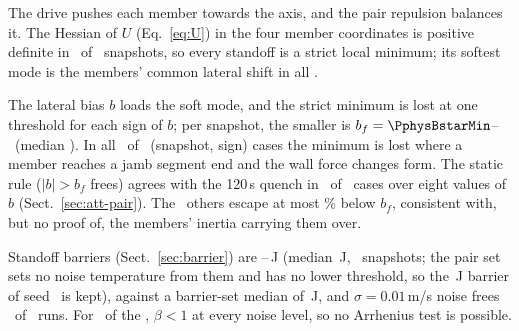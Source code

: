 The drive pushes each member towards the axis, and the pair repulsion balances it. The Hessian of $U$ (Eq.~\eqref{eq:U}) in the four member coordinates is positive definite in \PairStrictMin\ of \PairN\ snapshots, so every standoff is a strict local minimum; its softest mode is the members' common lateral shift in all \PairSoftCommon.

The lateral bias $b$ loads the soft mode, and the strict minimum is lost at one threshold for each sign of $b$; per snapshot, the smaller is $b_f=\PphysBstarMin$--\PairBstarMax\ (median \PairBstarMed). In all \RunNSixAtEnd\ of \RunNSixN\ (snapshot, sign) cases the minimum is lost where a member reaches a jamb segment end and the wall force changes form. The static rule ($|b|>b_f$ frees) agrees with the 120\,s quench in \PairFoldAgree\ of \PairFoldN\ cases over eight values of $b$ (Sect.~\ref{sec:att-pair}). The \PairFoldFN\ others escape at most \PphysFoldMissGap\% below $b_f$, consistent with, but no proof of, the members' inertia carrying them over.

Standoff barriers (Sect.~\ref{sec:barrier}) are \PphysPairBarMin--\PairBarMax\,J (median \PairBarMed\,J, \PairBarN\ snapshots; the pair set sets no noise temperature from them and has no lower threshold, so the \PphysPairBarMin\,J barrier of seed \RzCPairMinSeed\ is kept), against a barrier-set median of \PfourBarMedSpan\,J, and $\sigma=0.01$\,m/s noise frees \PairNoiseLowFreed\ of \PairNoiseLowN\ runs. For \FixAthreePairBelowOne\ of the \PairBarN, $\beta<1$ at every noise level, so no Arrhenius test is possible.

